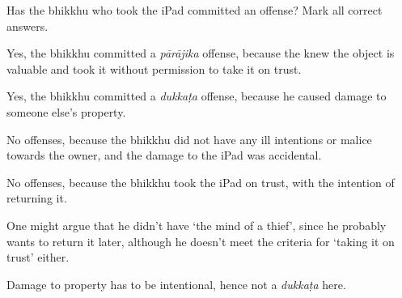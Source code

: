 \begin{exam}{\autoExamName}
\begin{problem}
  \bigskip

  Has the bhikkhu who took the iPad committed an offense? Mark all correct answers.

  \ifnosolutions
  \bigskip
  \else
  \clearpage
  \fi

  \begin{manswers}{1}
    \bChoices

     Yes, the bhikkhu committed a \emph{pārājika} offense, because the knew the object is valuable and took it without permission to take it on trust. \eAns

     Yes, the bhikkhu committed a \emph{dukkaṭa} offense, because he caused damage to someone else's property. \eAns

     No offenses, because the bhikkhu did not have any ill intentions or malice towards the owner, and the damage to the iPad was accidental. \eAns

     No offenses, because the bhikkhu took the iPad on trust, with the intention of returning it. \eAns

    \eChoices
  \end{manswers}

  \begin{solution}
    One might argue that he didn't have `the mind of a thief', since he probably wants to return it later,
    although he doesn't meet the criteria for `taking it on trust' either.

    Damage to property has to be intentional, hence not a \emph{dukkaṭa} here.
  \end{solution}

\end{problem}

\end{exam}
